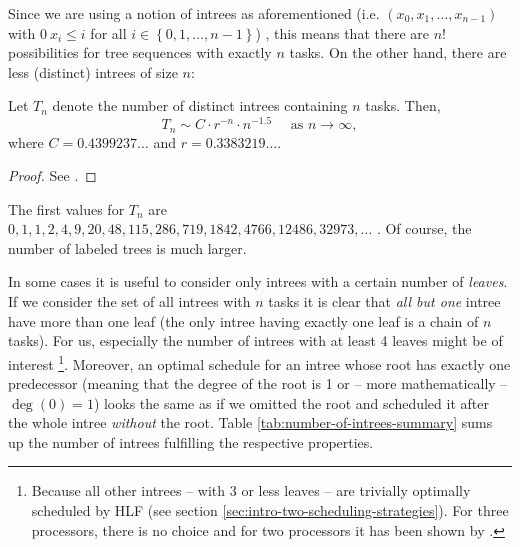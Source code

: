 
Since we are using a notion of intrees as aforementioned (i.e. $(x_0,x_1,\dots,x_{n-1})$ with 
$0\ x_i \leq i$ for all $i \in \left\{ 0,1,\dots,n-1 \right\}$)
, this means that there are $n!$ possibilities for tree sequences with exactly $n$ tasks. On the other hand, there are less (distinct) intrees of size $n$:

\begin{theorem}
  Let $T_n$ denote the number of distinct intrees containing $n$ tasks. Then,
  \begin{equation*}
    T_n \sim C\cdot r^{-n}\cdot n^{-1.5} 
    \quad \text{ as } n\rightarrow \infty,
  \end{equation*}
  where $C=0.4399237\dots$ and $r=0.3383219\dots$.
\end{theorem}

\begin{proof}
  See \cite{asymptotic_enum_odlyzko}.
\end{proof}

The first values for $T_n$ are $0, 1, 1, 2, 4, 9, 20, 48, 115, 286, 719, 1842, 4766, 12486, 32973, \dots$ \cite{oeisrootedtrees}. Of course, the number of labeled trees is much larger.

In some cases it is useful to consider only intrees with a certain number of \emph{leaves}. If we consider the set of all intrees with $n$ tasks it is clear that \emph{all but one} intree have more than one leaf (the only intree having exactly one leaf is a chain of $n$ tasks). For us, especially the number of intrees with at least 4 leaves might be of interest \footnote{Because all other intrees -- with 3 or less leaves -- are trivially optimally scheduled by HLF (see section \ref{sec:intro-two-scheduling-strategies}). For three processors, there is no choice and for two processors it has been shown by \cite{chandyreynoldsshortpaper1975}.}. Moreover, an optimal schedule for an intree whose root has exactly one predecessor (meaning that the degree of the root is 1 or -- more mathematically -- $\deg (0) = 1$) looks the same as if we omitted the root and scheduled it after the whole intree \emph{without} the root. Table \ref{tab:number-of-intrees-summary} sums up the number of intrees fulfilling the respective properties.


